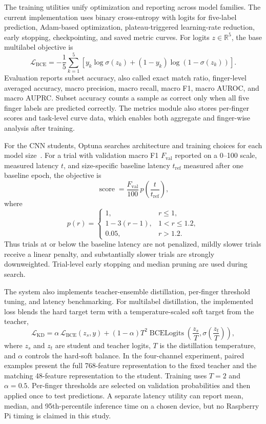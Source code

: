 The training utilities unify optimization and reporting across model families. The current implementation uses binary cross-entropy with logits for five-label prediction, Adam-based optimization, plateau-triggered learning-rate reduction, early stopping, checkpointing, and saved metric curves. For logits $z \in \mathbb{R}^5$, the base multilabel objective is
\[
\mathcal{L}_{\mathrm{BCE}}
=
-\frac{1}{5}
\sum_{k=1}^{5}
\left[
y_k \log \sigma(z_k)
+ (1-y_k) \log \left(1-\sigma(z_k)\right)
\right].
\]
Evaluation reports subset accuracy, also called exact match ratio, finger-level averaged accuracy, macro precision, macro recall, macro F1, macro AUROC, and macro AUPRC. Subset accuracy counts a sample as correct only when all five finger labels are predicted correctly. The metrics module also stores per-finger scores and task-level curve data, which enables both aggregate and finger-wise analysis after training.

For the CNN students, Optuna searches architecture and training choices for each model size~\citep{akiba2019optuna}. For a trial with validation macro F1 $F_{\mathrm{val}}$ reported on a 0--100 scale, measured latency $t$, and size-specific baseline latency $t_{\mathrm{ref}}$ measured after one baseline epoch, the objective is
\[
\operatorname{score}
= \frac{F_{\mathrm{val}}}{100}\, p\!\left(\frac{t}{t_{\mathrm{ref}}}\right),
\]
where
\[
p(r)=
\begin{cases}
1, & r \le 1,\\
1 - 3(r-1), & 1 < r \le 1.2,\\
0.05, & r > 1.2.
\end{cases}
\]
Thus trials at or below the baseline latency are not penalized, mildly slower trials receive a linear penalty, and substantially slower trials are strongly downweighted. Trial-level early stopping and median pruning are used during search.

The system also implements teacher-ensemble distillation, per-finger threshold tuning, and latency benchmarking. For multilabel distillation, the implemented loss blends the hard target term with a temperature-scaled soft target from the teacher,
\[
\mathcal{L}_{\mathrm{KD}}
=
\alpha \, \mathcal{L}_{\mathrm{BCE}}(z_s, y)
+
(1-\alpha) T^2
\operatorname{BCELogits}\!\left(\frac{z_s}{T}, \sigma\!\left(\frac{z_t}{T}\right)\right),
\]
where $z_s$ and $z_t$ are student and teacher logits, $T$ is the distillation temperature, and $\alpha$ controls the hard-soft balance. In the four-channel experiment, paired examples present the full 768-feature representation to the fixed teacher and the matching 48-feature representation to the student. Training uses $T=2$ and $\alpha=0.5$. Per-finger thresholds are selected on validation probabilities and then applied once to test predictions. A separate latency utility can report mean, median, and 95th-percentile inference time on a chosen device, but no Raspberry Pi timing is claimed in this study.

